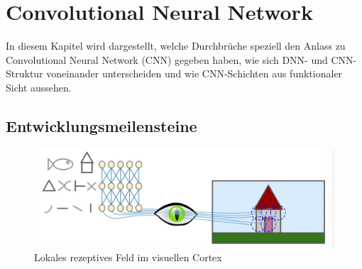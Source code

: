 \chapter{Convolutional Neural Network} \label{chap:cnn}


In diesem Kapitel wird dargestellt, welche Durchbrüche speziell den Anlass zu Convolutional Neural Network (CNN) gegeben haben, wie sich DNN- und CNN-Struktur voneinander unterscheiden und wie CNN-Schichten aus funktionaler Sicht aussehen.

\section{Entwicklungsmeilensteine}

\begin{figure}[!hb]
	\centering
	\includegraphics[width=\linewidth]{images/local_receptive_field}
	\caption{Lokales rezeptives Feld im visuellen Cortex \protect\cite{LocalReceptiveField}}
	\label{fig:1959CatExpr}
\end{figure}

